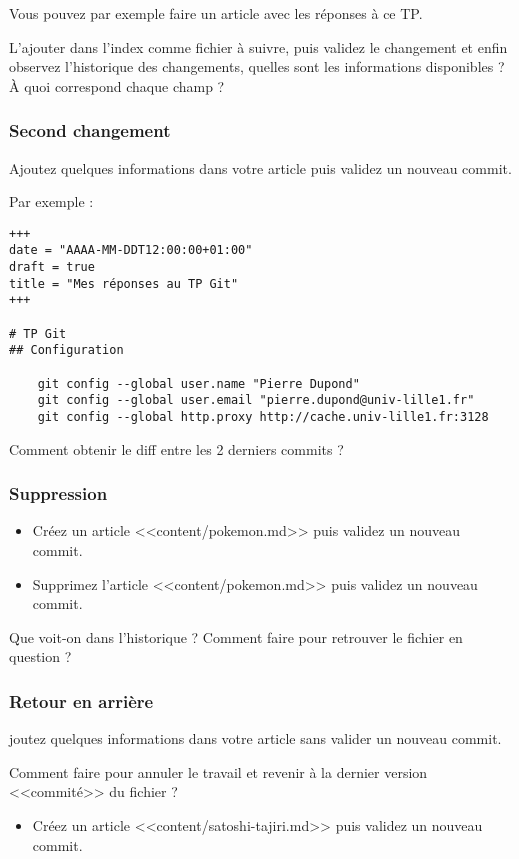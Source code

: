 \documentclass[a4paper]{article}
\newcounter{question}
\begin{document}
Vous pouvez par exemple faire un article avec les réponses à ce TP.

L'ajouter dans l'index comme fichier à suivre, puis validez le changement et enfin observez l'historique des changements, quelles sont les informations disponibles ? À quoi correspond chaque champ ?

\subsubsection{Second changement}
Ajoutez quelques informations dans votre article puis validez un nouveau commit.

Par exemple : 
\begin{verbatim}
+++
date = "AAAA-MM-DDT12:00:00+01:00"
draft = true
title = "Mes réponses au TP Git"
+++

# TP Git
## Configuration

    git config --global user.name "Pierre Dupond"
    git config --global user.email "pierre.dupond@univ-lille1.fr"
    git config --global http.proxy http://cache.univ-lille1.fr:3128

\end{verbatim}

Comment obtenir le diff entre les 2 derniers commits ?

\subsubsection{Suppression}
\begin{itemize}
\item Créez un article <<content/pokemon.md>> puis validez un nouveau commit. 
\item Supprimez l'article <<content/pokemon.md>> puis validez un nouveau commit. 
\end{itemize}

Que voit-on dans l'historique ?
Comment faire pour retrouver le fichier en question ?

\subsubsection{Retour en arrière}
joutez quelques informations dans votre article sans valider un nouveau commit.

Comment faire pour annuler le travail et revenir à la dernier version <<commité>> du fichier ?

\begin{itemize}
  \item Créez un article <<content/satoshi-tajiri.md>> puis validez un nouveau commit.
\end{itemize}
\end{document}
